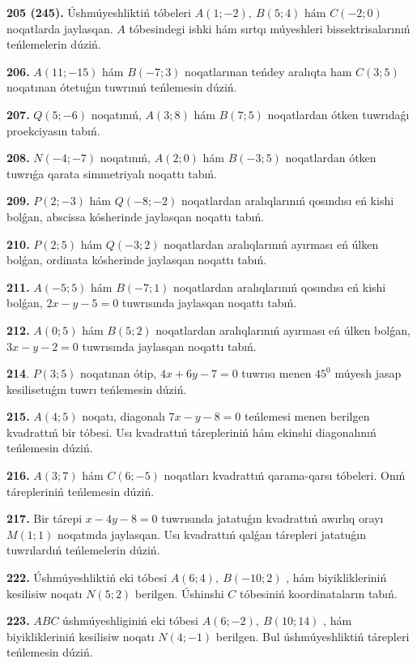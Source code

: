 \documentclass{article}
\begin{document}
\textbf{205 (245).} Úshmúyeshliktiń tóbeleri \(A(1;-2),\ B(5; 4)\) hám
\(C(-2;0)\) noqatlarda jaylasqan. $A$ tóbesindegi ishki hám sırtqı
múyeshleri bissektrisalarınıń teńlemelerin dúziń.

\textbf{206.} \(A(11; - 15)\) hám \(B( - 7;3)\) noqatlarınan
teńdey aralıqta ham \(C(3; 5)\) noqatınan ótetuǵın tuwrınıń teńlemesin
dúziń.

\textbf{207.} \(Q(5; - 6)\) noqatınıń, \(A(3;8)\) hám \(B(7;5)\) 
noqatlardan ótken tuwrıdaǵı proekciyasın tabıń.

\textbf{208.} \(N( - 4; - 7)\) noqatınıń, \(A(2;0)\) hám \(B( - 3;5)\) 
noqatlardan ótken tuwrıǵa qarata simmetriyalı noqattı tabıń.

\textbf{209.} \(P(2; - 3)\) hám \(Q( - 8; - 2)\) noqatlardan
aralıqlarınıń qosındısı eń kishi bolǵan, abscissa kósherinde jaylasqan
noqattı tabıń.

\textbf{210.} \(P(2;5)\) hám \(Q( - 3;2)\) noqatlardan aralıqlarınıń
ayırması eń úlken bolǵan, ordinata kósherinde jaylasqan noqattı tabıń.

\textbf{211.} \(A( - 5;5)\) hám \(B( - 7;1)\) noqatlardan
aralıqlarınıń qosındısı eń kishi bolǵan, \(2x - y - 5 = 0\) tuwrısında
jaylasqan noqattı tabıń.

\textbf{212.} \(A(0;5)\) hám \(B(5;2)\) noqatlardan aralıqlarınıń
ayırması eń úlken bolǵan, \(3x - y - 2 = 0\) tuwrısında jaylasqan
noqattı tabıń.

\textbf{214}. \(P(3;5)\) noqatınan ótip, \(4x + 6y - 7 = 0\) tuwrısı
menen \(45^{0}\) múyesh jasap kesilisetuǵın tuwrı teńlemesin dúziń.

\textbf{215.} \(A(4;5)\) noqatı, diagonalı \(7x - y - 8 = 0\) teńlemesi
menen berilgen kvadrattıń bir tóbesi. Usı kvadrattıń tárepleriniń hám
ekinshi diagonalınıń teńlemesin dúziń.

\textbf{216.} \(A(3;7)\) hám \(C(6; - 5)\) noqatları kvadrattıń
qarama-qarsı tóbeleri. Onıń tárepleriniń teńlemesin dúziń.

\textbf{217.} Bir tárepi \(x - 4y - 8 = 0\) tuwrısında jatatuǵın
kvadrattıń awırlıq orayı \(M(1;1)\) noqatında jaylasqan. Usı kvadrattıń
qalǵan tárepleri jatatuǵın tuwrılardıń teńlemelerin dúziń.

\textbf{222.} Úshmúyeshliktiń eki tóbesi \(A(6;4),\ B( - 10;2)\) , hám
biyiklikleriniń kesilisiw noqatı \(N(5;2)\) berilgen. Úshinshi $C$
tóbesiniń koordinataların tabıń.

\textbf{223.} $ABC$ úshmúyeshliginiń eki tóbesi
\(A(6; - 2),\ B(10;14)\) , hám biyiklikleriniń kesilisiw noqatı
\(N(4; - 1)\) berilgen. Bul úshmúyeshliktiń tárepleri teńlemesin dúziń.
\end{document}
